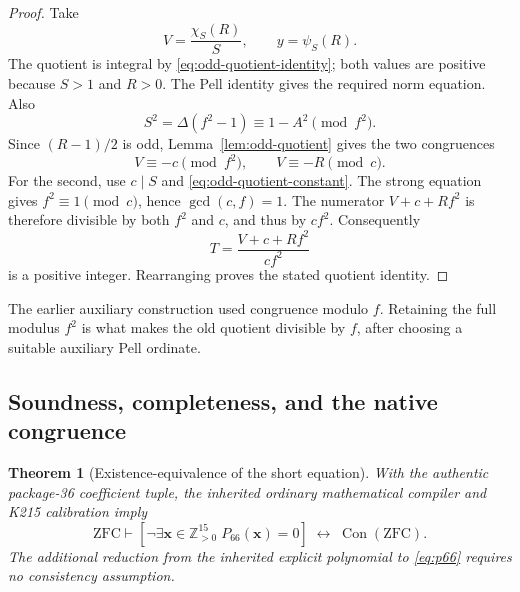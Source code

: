 \documentclass[11pt,letterpaper]{article}
\newtheorem{theorem}{Theorem}[section]
\theoremstyle{remark}\newtheorem{remark}[theorem]{Remark}
\newcommand{\Pos}{\mathbb Z_{>0}}
\begin{document}
\begin{proof}
Take
\[
 V=\frac{\chi_S(R)}{S},\qquad y=\psi_S(R).
\]
The quotient is integral by \eqref{eq:odd-quotient-identity}; both values
are positive because \(S>1\) and \(R>0\).  The Pell identity gives the
required norm equation.  Also
\[
 S^2=\Delta(f^2-1)\equiv1-A^2\pmod{f^2}.
\]
Since \((R-1)/2\) is odd, Lemma~\ref{lem:odd-quotient} gives the two
congruences
\begin{equation}
 V\equiv-c\pmod{f^2},\qquad V\equiv-R\pmod c.
 \label{eq:squared-modulus-congruences}
\end{equation}
For the second, use \(c\mid S\) and
\eqref{eq:odd-quotient-constant}.  The strong equation gives
\(f^2\equiv1\pmod c\), hence \(\gcd(c,f)=1\).
The numerator \(V+c+Rf^2\) is therefore divisible by both \(f^2\) and
\(c\), and thus by \(cf^2\).  Consequently
\[
 T=\frac{V+c+Rf^2}{cf^2}
\]
is a positive integer.  Rearranging proves the stated quotient identity.
\end{proof}

The earlier auxiliary construction used congruence modulo \(f\).  Retaining
the full modulus \(f^2\) is what makes the old quotient divisible by
\(f\), after choosing a suitable auxiliary Pell ordinate.

\subsection{Soundness, completeness, and the native congruence}

\begin{theorem}[Existence-equivalence of the short equation]
\label{thm:p66-consistency}
With the authentic package-36 coefficient tuple, the inherited ordinary
mathematical compiler and K215 calibration imply
\[
 \mathrm{ZFC}\vdash
 \left[
 \neg\exists\mathbf{x}\in\Pos^{15}\;P_{66}(\mathbf{x})=0
 \right]
 \;\longleftrightarrow\;
 \operatorname{Con}(\mathrm{ZFC}).
\]
The additional reduction from the inherited explicit polynomial to
\eqref{eq:p66} requires no consistency assumption.
\end{theorem}
\end{document}
